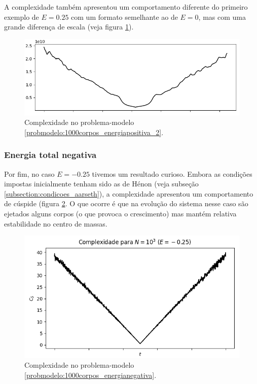 A complexidade também apresentou um comportamento diferente do primeiro exemplo de $E=0.25$ com um formato semelhante ao de $E=0$, mas com uma grande diferença de escala (veja figura \ref{fig:1000corpos_energiapositiva_complexidade_2}).

\begin{figure}
    \centering
    \includegraphics[width=0.8\linewidth]{tcc//img/1000corpos_energiapositiva_complexidade_2.png}
    \caption{Complexidade no problema-modelo \ref{probmodelo:1000corpos_energiapositiva_2}.}
    \label{fig:1000corpos_energiapositiva_complexidade_2}
\end{figure}


\subsubsection{Energia total negativa}
Por fim, no caso $E=-0.25$ tivemos um resultado curioso. Embora as condições impostas inicialmente tenham sido as de Hénon (veja subseção \ref{subsection:condicoes_aarseth}), a complexidade apresentou um comportamento de cúspide (figura \ref{fig:1000corpos_energianegativa_complexidade}. O que ocorre é que na evolução do sistema nesse caso são ejetados alguns corpos (o que provoca o crescimento) mas mantém relativa estabilidade no centro de massas.

\begin{figure}[H]
    \centering
    \includegraphics[width=0.6\linewidth]{tcc//img/complexidade1000_energianegativa.png}
    \caption{Complexidade no problema-modelo \ref{probmodelo:1000corpos_energianegativa}.}
    \label{fig:1000corpos_energianegativa_complexidade}
\end{figure}

